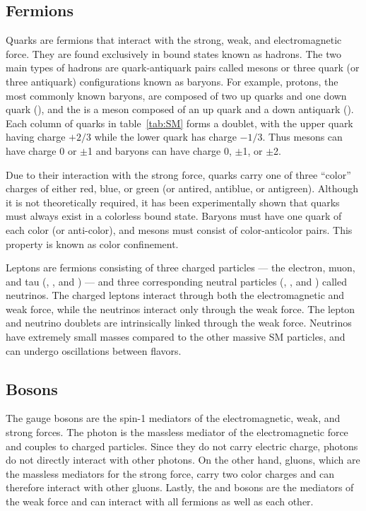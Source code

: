 \subsection{Fermions} \label{sec:sm_quarks}
Quarks are fermions that interact with the strong, weak, and electromagnetic force. They are found exclusively in bound states known as hadrons. The two main types of hadrons are quark-antiquark pairs called mesons or three quark (or three antiquark) configurations known as baryons. For example, protons, the most commonly known baryons, are composed of two up quarks and one down quark (\PQuns\PQuns\PQdns), and the \PGpp is a meson composed of an up quark and a down antiquark (\PQuns\PAQdns). Each column of quarks in table~\ref{tab:SM} forms a doublet, with the upper quark having charge $+2/3$ while the lower quark has charge $-1/3$. Thus mesons can have charge 0 or $\pm$1 and baryons can have charge 0, $\pm$1, or $\pm$2.

Due to their interaction with the strong force, quarks carry one of three ``color'' charges of either red, blue, or green (or antired, antiblue, or antigreen). Although it is not theoretically required, it has been experimentally shown that quarks must always exist in a colorless bound state. Baryons must have one quark of each color (or anti-color), and mesons must consist of color-anticolor pairs. This property is known as color confinement.

Leptons are fermions consisting of three charged particles --- the electron, muon, and tau (\Pe, \PGm, and \PGt) --- and three corresponding neutral particles (\PGne, \PGnGm, and \PGnGt) called neutrinos. The charged leptons interact through both the electromagnetic and weak force, while the neutrinos interact only through the weak force. The lepton and neutrino doublets are intrinsically linked through the weak force. Neutrinos have extremely small masses compared to the other massive SM particles, and can undergo oscillations between flavors.

\subsection{Bosons} \label{sec:sm_bosons}
The gauge bosons are the spin-1 mediators of the electromagnetic, weak, and strong forces. The photon is the massless mediator of the electromagnetic force and couples to charged particles. Since they do not carry electric charge, photons do not directly interact with other photons. On the other hand, gluons, which are the massless mediators for the strong force, carry two color charges and can therefore interact with other gluons. Lastly, the \PZ and \PWpm bosons are the mediators of the weak force and can interact with all fermions as well as each other.

